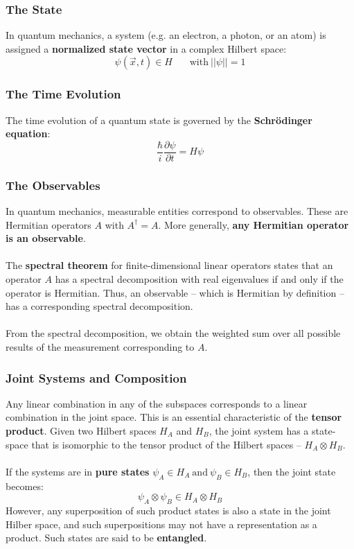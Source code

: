 \documentclass{article}
\begin{document}
\subsubsection{The State}
In quantum mechanics, a system (e.g. an electron, a photon, or an atom) is assigned a \textbf{normalized state vector} in a complex Hilbert space:
\[ \psi(\overrightarrow x, t) \in H ~~~~~~~~ \text{with}~||\psi|| = 1 \]

\subsubsection{The Time Evolution}
The time evolution of a quantum state is governed by the \textbf{Schr\"odinger equation}:
\[ \displaystyle\frac{\hbar}{i} \frac{\partial \psi}{\partial t} = H \psi \]

\subsubsection{The Observables}
In quantum mechanics, measurable entities correspond to observables. These are Hermitian operators $A$ with $A^\dagger = A$. More generally, \textbf{any Hermitian operator is an observable}. \\ \\
The \textbf{spectral theorem} for finite-dimensional linear operators states that an operator $A$ has a spectral decomposition with real eigenvalues if and only if the operator is Hermitian. Thus, an observable -- which is Hermitian by definition -- has a corresponding spectral decomposition. \\ \\
From the spectral decomposition, we obtain the weighted sum over all possible results of the measurement corresponding to $A$.

\subsubsection{Joint Systems and Composition}
Any linear combination in any of the subspaces corresponds to a linear combination in the joint space. This is an essential characteristic of the \textbf{tensor product}. Given two Hilbert spaces $H_A$ and $H_B$, the joint system has a state-space that is isomorphic to the tensor product of the Hilbert spaces -- $H_A \otimes H_B$. \\ \\
If the systems are in \textbf{pure states} $\psi_A \in H_A ~\text{and}~ \psi_B \in H_B$, then the joint state becomes:
\[ \psi_A \otimes \psi_B \in H_A \otimes H_B \]
However, any superposition of such product states is also a state in the joint Hilber space, and such superpositions may not have a representation as a product. Such states are said to be \textbf{entangled}.
\end{document}
